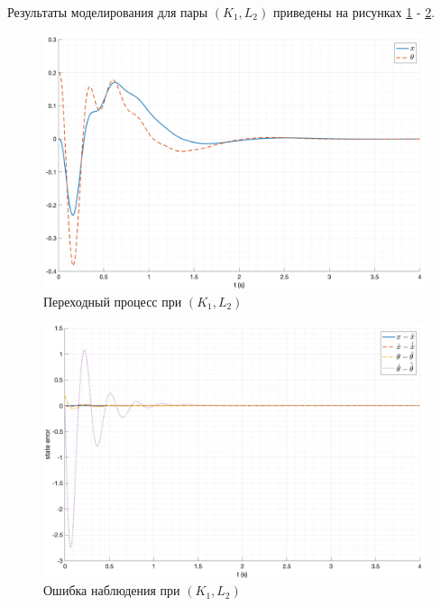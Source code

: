 Результаты моделирования для пары $(K_1, L_2)$ приведены на рисунках \ref{fig:KL_3_out} - \ref{fig:KL_3_err}.
\begin{figure}[ht!]
    \centering
    \includegraphics[width=\textwidth]{media/plots/nonmodal_observer_controller/kl_3.png}
    \caption{Переходный процесс при $(K_1, L_2)$}
    \label{fig:KL_3_out}
\end{figure}
\begin{figure}[ht!]
    \centering
    \includegraphics[width=\textwidth]{media/plots/nonmodal_observer_controller/kl_err_3.png}
    \caption{Ошибка наблюдения при $(K_1, L_2)$}
    \label{fig:KL_3_err}
\end{figure}

